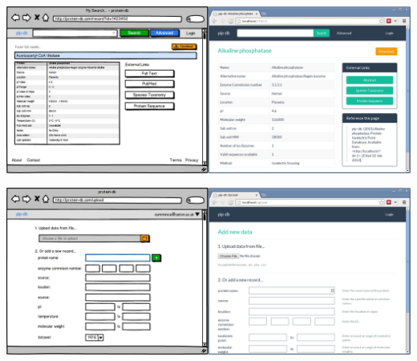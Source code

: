\noindent\includegraphics[width=\textwidth]{assets/m1-comparison-details}\br{}

\noindent\includegraphics[width=\textwidth]{assets/m1-comparison-upload}
